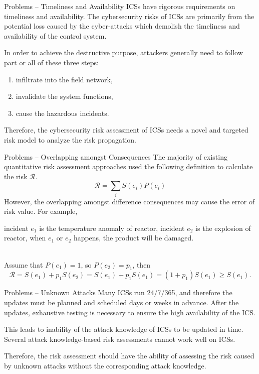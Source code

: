 \documentclass[10pt, compress]{beamer}
\newcommand{\risk}{\mathscr{R}}
\begin{document}
\begin{frame}{Problems -- Timeliness and Availability}
    ICSs have rigorous requirements on timeliness and availability. The cybersecurity risks of ICSs are primarily from the potential loss caused by the cyber-attacks which demolish the timeliness and availability of the control system.
    
    In order to achieve the destructive purpose, attackers generally need to follow part or all of these three steps: 
    \begin{enumerate}
      \item infiltrate into the field network,
      \item invalidate the system functions,
      \item cause the hazardous incidents.
    \end{enumerate}
    
    Therefore, the cybersecurity risk assessment of ICSs needs  a novel and targeted risk model to analyze the risk propagation.
\end{frame}

\begin{frame}{Problems -- Overlapping amongst Consequences}
    The majority of existing quantitative risk assessment approaches used the following definition to calculate the risk $\risk$.
    \[
        \risk = \sum_i S(e_i)P(e_i)
    \]    
    However, the overlapping amongst difference consequences may cause the error of risk value. For example,
    \vspace{10pt}\\
    \begin{minipage}[l]{0.2\textwidth}
      
    \end{minipage}
    \begin{minipage}[l]{0.8\textwidth}
        incident $e_1$ is the temperature anomaly of reactor, incident $e_2$ is the explosion of reactor, when $e_1$ or $e_2$ happens, the product will be damaged.
    \end{minipage}
    \vspace{10pt}\\
    Assume that $P(e_1) = 1$, so $P(e_2) = p_1$, then 
    \[
        \risk = S(e_1) + p_1S(e_2) = S(e_1) + p_1S(e_1) = (1+p_1)S(e_1) \geq S(e_1)\text{.}
    \]    
\end{frame}

\begin{frame}{Problems -- Unknown Attacks}
    Many ICSs run 24/7/365, and therefore the updates must be planned and scheduled days or weeks in advance. After the updates, exhaustive testing is necessary to ensure the high availability of the ICS.
    
    This leads to inability of the attack knowledge of ICSs to be updated in time. Several attack knowledge-based risk assessments cannot work well on ICSs.
    
    Therefore, the risk assessment should have the ability of assessing the risk caused by unknown attacks without the corresponding attack knowledge.
\end{frame}
\end{document}
